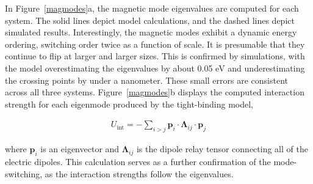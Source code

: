 \documentclass[journal=apchd5,manuscript=article]{achemso}
\begin{document}
In Figure~\ref{magmodes}a, the magnetic mode eigenvalues are computed for each system. The solid lines depict model calculations, and the dashed lines depict simulated results. Interestingly, the magnetic modes exhibit a dynamic energy ordering, switching order twice as a function of scale. It is presumable that they continue to flip at larger and larger sizes. This is confirmed by simulations, with the model overestimating the eigenvalues by about 0.05 eV and underestimating the crossing points by under a nanometer. These small errors are consistent across all three systems. Figure~\ref{magmodes}b displays the computed interaction strength for each eigenmode produced by the tight-binding model,

\begin{equation}
\begin{aligned}
U_{\textrm{int}} = -\sum_{i>j}\textbf{p}_{i}\cdot\boldsymbol{\Lambda}_{ij}\cdot\textbf{p}_{j}
\label{interactionenergy}
\end{aligned}
\end{equation}

where $\textbf{p}_{i}$ is an eigenvector and $\boldsymbol{\Lambda}_{ij}$ is the dipole relay tensor connecting all of the electric dipoles. This calculation serves as a further confirmation of the mode-switching, as the interaction strengths follow the eigenvalues.
\end{document}
